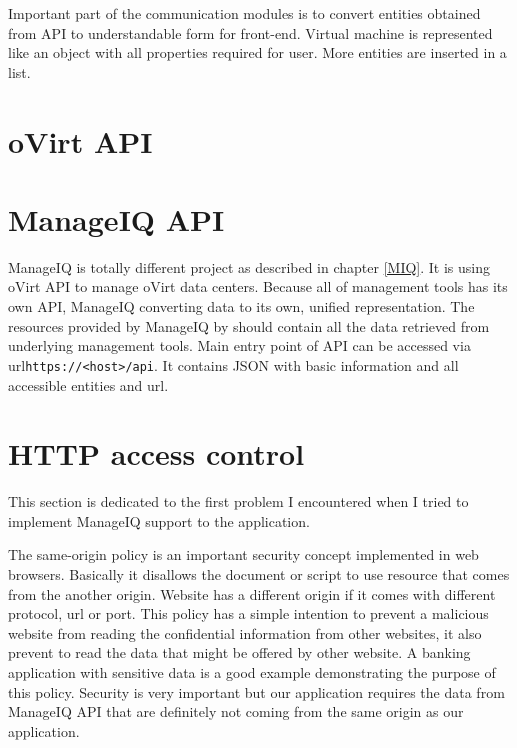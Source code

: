 Important part of the communication modules is to convert entities obtained from API to understandable form for front-end. Virtual machine is represented like an object with all properties required for user. More entities are inserted in a list.


\section{oVirt API}


\section{ManageIQ API}\label{miq}
ManageIQ is totally different project as described in chapter \ref{MIQ}. It is using oVirt API to manage oVirt data centers. Because all of management tools has its own API, ManageIQ converting data to its own, unified representation. The resources provided by ManageIQ by should contain all the data retrieved from underlying management tools.
Main entry point of API can be accessed via url\texttt{https://<host>/api}. It contains JSON with basic information and all accessible entities and url. 


\section{HTTP access control}
This section is dedicated to the first problem I encountered when I tried to implement ManageIQ support to the application.

The same-origin policy\cite{policy} is an important security concept implemented in web browsers. Basically it disallows the document or script to use resource that comes from the another origin. Website has a different origin if it comes with different protocol, url or port. This policy has a simple intention to prevent a malicious website from reading the confidential information from other websites, it also prevent to read the data that might be offered by other website. A banking application with sensitive data is a good example demonstrating the purpose of this policy. Security is very important but our application requires the data from ManageIQ API that are definitely not coming from the same origin as our application.

